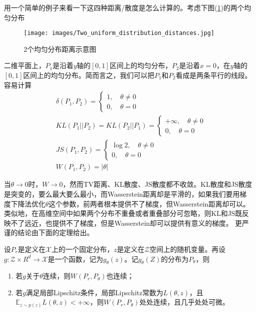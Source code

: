             用一个简单的例子来看一下这四种距离/散度是怎么计算的。考虑下图(\ref{fig:2个均匀分布距离示意图})的两个均匀分布
                \begin{figure}[H]
                \centering
                \texttt{[image: images/Two\_uniform\_distribution\_distances.jpg]}
                \caption{2个均匀分布距离示意图}
                \label{fig:2个均匀分布距离示意图}
                \end{figure}
            二维平面上，$P_1$是沿着$y$轴的$[0,1]$区间上的均匀分布，$P_2$是沿着$x=0$，在$y$轴的$[0,1]$区间上的均匀分布。简而言之，我们可以把$P_1$和$P_2$看成是两条平行的线段。容易计算
            \begin{align*}
            &\delta(P_1,P_2) =
            \left\{
            \begin{aligned}
            1, \quad \theta \neq 0\\
            0,\quad \theta = 0
            \end{aligned}
            \right.\\
            &KL(P_1||P_2) = KL(P_2||P_1) =
            \left\{
            \begin{aligned}
            +\infty ,\quad \theta \neq 0\\
            0,\quad \theta = 0
            \end{aligned}
            \right.\\
            &JS(P_1,P_2) =
            \left\{
            \begin{aligned}
            \log 2,\quad \theta \neq 0\\
            0,\quad \theta =0
            \end{aligned}
            \right.\\
            &W(P_1,P_2) = |\theta|
            \end{align*}
            \par
            当$\theta \to 0$时，$W\to 0$，然而TV距离、KL散度、JS散度都不收敛。KL散度和JS散度是突变的，要么最大要么最小，而Wasserstein距离却是平滑的，如果我们要用梯度下降法优化$\theta$这个参数，前两者根本提供不了梯度，但Wasserstein距离却可以。类似地，在高维空间中如果两个分布不重叠或者重叠部分可忽略，则KL和JS既反映不了远近，也提供不了梯度，但是Wasserstein却可以提供有意义的梯度。
            更严谨的结论由下面的定理给出。
            \begin{theorem}[Theorem 1]
            设$P_r$是定义在$\mathcal{X}$上的一个固定分布，$z$是定义在$\mathcal{Z}$空间上的随机变量。再设$g:\mathcal{Z}\times R^d\to \mathcal{X}$是一个函数，记为$g_\theta(z)$。记$g_\theta(Z)$的分布为$P_\theta$，则
            \begin{enumerate}
            \item  若$g$关于$\theta$连续，则$W(P_r,P_\theta)$也连续；
            \item 若$g$满足局部Lipschitz条件，局部Lipschitz常数为$L(\theta,z)$，且$\mathbb{E}_{z\sim p(z)}L(\theta,z)< +\infty$，则$W(P_r,P_\theta)$处处连续，且几乎处处可微。
            \end{enumerate}
            \end{theorem}
